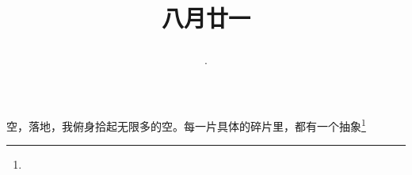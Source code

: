 \title{\date[d=23,m=9,y=2024][year:cn-y,年,month:cn,day:cn,日,·,weekday]·八月廿一 }
空，落地，我俯身拾起无限多的空。每一片具体的碎片里，都有一个抽象\footnote{ }

